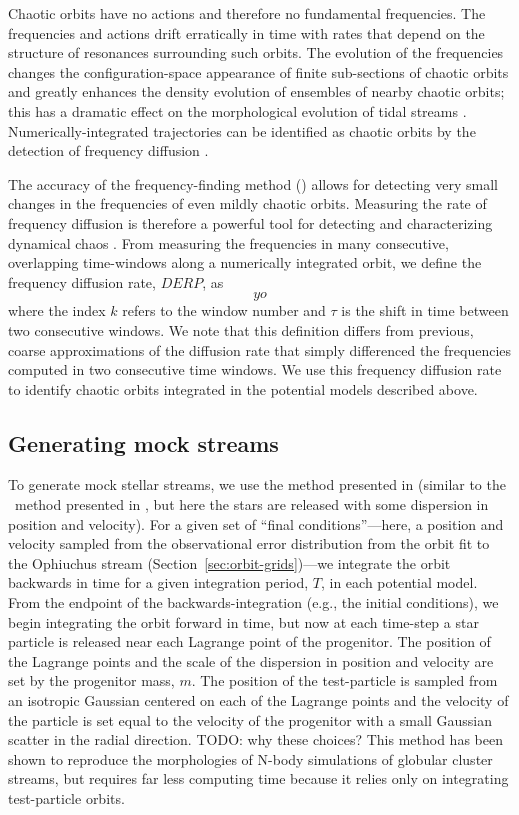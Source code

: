\documentclass[letterpaper,12pt,preprint]{aastex}
\newcommand{\todo}[1]{{\color{red} TODO: #1}}
\begin{document}
Chaotic orbits have no actions and therefore no fundamental frequencies. The frequencies and actions drift erratically in time with rates that depend on the structure of resonances surrounding such orbits. The evolution of the frequencies changes the configuration-space appearance of finite sub-sections of chaotic orbits and greatly enhances the density evolution of ensembles of nearby chaotic orbits; this has a dramatic effect on the morphological evolution of tidal streams \citep[e.g.,][]{apw15-chaos}. Numerically-integrated trajectories can be identified as chaotic orbits by the detection of frequency diffusion \citep[e.g.,][]{laskar96, valluri98}. 

The accuracy of the frequency-finding method (\superfreq) allows for detecting very small changes in the frequencies of even mildly chaotic orbits. Measuring the rate of frequency diffusion is therefore a powerful tool for detecting and characterizing dynamical chaos \citep[e.g.,][]{many}. From measuring the frequencies in many consecutive, overlapping time-windows along a numerically integrated orbit, we define the frequency diffusion rate, $DERP$, as
\begin{equation}
	yo
\end{equation}
where the index $k$ refers to the window number and $\tau$ is the shift in time between two consecutive windows. We note that this definition differs from previous, coarse approximations of the diffusion rate that simply differenced the frequencies computed in two consecutive time windows. We use this frequency diffusion rate to identify chaotic orbits integrated in the potential models described above.

\subsection{Generating mock streams}\label{sec:mocks}

To generate mock stellar streams, we use the method presented in \citep{fardal15} (similar to the \streakline\ method presented in \citet{kuepper12}, but here the stars are released with some dispersion in position and velocity). For a given set of ``final conditions''---here, a position and velocity sampled from the observational error distribution from the orbit fit to the Ophiuchus stream (Section~\ref{sec:orbit-grids})---we integrate the orbit backwards in time for a given integration period, $T$, in each potential model. From the endpoint of the backwards-integration (e.g., the initial conditions), we begin integrating the orbit forward in time, but now at each time-step a star particle is released near each Lagrange point of the progenitor. The position of the Lagrange points and the scale of the dispersion in position and velocity are set by the progenitor mass, $m$. The position of the test-particle is sampled from an isotropic Gaussian centered on each of the Lagrange points and the velocity of the particle is set equal to the velocity of the progenitor with a small Gaussian scatter in the radial direction. \todo{why these choices?} This method has been shown to reproduce the morphologies of N-body simulations of globular cluster streams, but requires far less computing time because it relies only on integrating test-particle orbits.
\end{document}
